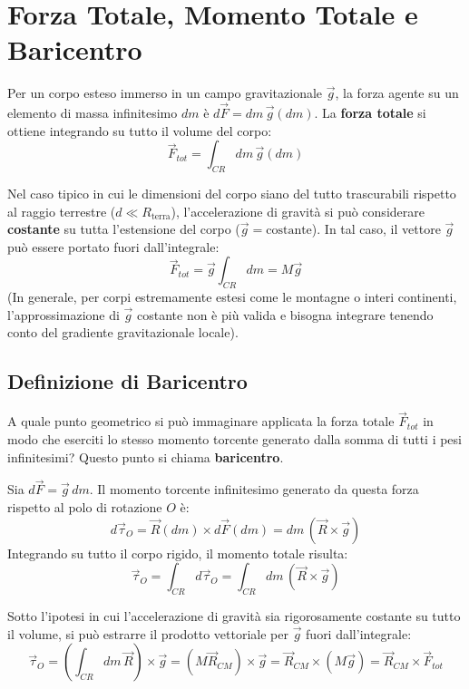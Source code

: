 \section{Forza Totale, Momento Totale e Baricentro}
Per un corpo esteso immerso in un campo gravitazionale $\vec{g}$, la forza agente su un elemento di massa infinitesimo $dm$ è $d\vec{F} = dm \, \vec{g}(dm)$. La \textbf{forza totale} si ottiene integrando su tutto il volume del corpo:
\begin{equation}
    \vec{F}_{tot} = \int_{CR} dm \, \vec{g}(dm)
\end{equation}

Nel caso tipico in cui le dimensioni del corpo siano del tutto trascurabili rispetto al raggio terrestre ($d \ll R_{\text{terra}}$), l'accelerazione di gravità si può considerare \textbf{costante} su tutta l'estensione del corpo ($\vec{g} = \text{costante}$). In tal caso, il vettore $\vec{g}$ può essere portato fuori dall'integrale:
\begin{equation}
    \vec{F}_{tot} = \vec{g} \int_{CR} dm = M \vec{g}
\end{equation}
(In generale, per corpi estremamente estesi come le montagne o interi continenti, l'approssimazione di $\vec{g}$ costante non è più valida e bisogna integrare tenendo conto del gradiente gravitazionale locale).

\subsection{Definizione di Baricentro}
A quale punto geometrico si può immaginare applicata la forza totale $\vec{F}_{tot}$ in modo che eserciti lo stesso momento torcente generato dalla somma di tutti i pesi infinitesimi? Questo punto si chiama \textbf{baricentro}.

Sia $d\vec{F} = \vec{g} \, dm$. Il momento torcente infinitesimo generato da questa forza rispetto al polo di rotazione $O$ è:
\begin{equation}
    d\vec{\tau}_O = \vec{R}(dm) \times d\vec{F}(dm) = dm \, (\vec{R} \times \vec{g})
\end{equation}
Integrando su tutto il corpo rigido, il momento totale risulta:
\begin{equation}
    \vec{\tau}_O = \int_{CR} d\vec{\tau}_O = \int_{CR} dm \, (\vec{R} \times \vec{g})
\end{equation}

Sotto l'ipotesi in cui l'accelerazione di gravità sia rigorosamente costante su tutto il volume, si può estrarre il prodotto vettoriale per $\vec{g}$ fuori dall'integrale:
\begin{equation}
    \vec{\tau}_O = \left( \int_{CR} dm \, \vec{R} \right) \times \vec{g} = (M \vec{R}_{CM}) \times \vec{g} = \vec{R}_{CM} \times (M \vec{g}) = \vec{R}_{CM} \times \vec{F}_{tot}
\end{equation}


